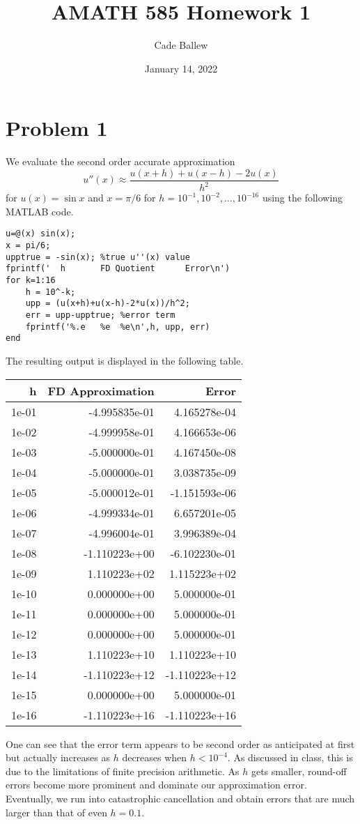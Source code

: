 \documentclass{article}
\title{AMATH 585 Homework 1}
\author{Cade Ballew}
\date{January 14, 2022}
\begin{document}
\maketitle

\section{Problem 1}
We evaluate the second order 
accurate approximation 
\[
u'' (x) \approx \frac{u(x+h) + u(x-h) - 2 u(x)}{h^2}
\]
for $u(x) = \sin x$ and $x = \pi / 6$ for $h = 10^{-1} , 10^{-2} , \ldots ,
10^{-16}$ using the following MATLAB code. 
\begin{verbatim}
u=@(x) sin(x);
x = pi/6;
upptrue = -sin(x); %true u''(x) value
fprintf('  h       FD Quotient      Error\n')
for k=1:16
    h = 10^-k;
    upp = (u(x+h)+u(x-h)-2*u(x))/h^2;
    err = upp-upptrue; %error term
    fprintf('%.e   %e  %e\n',h, upp, err)
end
\end{verbatim}
The resulting output is displayed in the following table. 

\begin{table}[H]\centering
\begin{tabular}{|r|r|r|} \hline
{h} & {FD Approximation} & {Error} \\ \hline
1e-01   &-4.995835e-01&  4.165278e-04\\
1e-02  & -4.999958e-01&  4.166653e-06\\
1e-03 &  -5.000000e-01&  4.167450e-08\\
1e-04&   -5.000000e-01&  3.038735e-09\\
1e-05   &-5.000012e-01 & -1.151593e-06\\
1e-06  & -4.999334e-01  &6.657201e-05\\
1e-07 &  -4.996004e-01  &3.996389e-04\\
1e-08&   -1.110223e+00&  -6.102230e-01\\
1e-09   &1.110223e+02 & 1.115223e+02\\
1e-10  & 0.000000e+00 & 5.000000e-01\\
1e-11 &  0.000000e+00 & 5.000000e-01\\
1e-12&   0.000000e+00 & 5.000000e-01\\
1e-13  & 1.110223e+10 & 1.110223e+10\\
1e-14 &  -1.110223e+12 & -1.110223e+12\\
1e-15&   0.000000e+00 & 5.000000e-01\\
1e-16&   -1.110223e+16 & -1.110223e+16\\ \hline
\end{tabular}
\end{table}
One can see that the error term appears to be second order as anticipated at first but actually increases as $h$ decreases when $h<10^{-4}$. As discussed in class, this is due to the limitations of finite precision arithmetic. As $h$ gets smaller, round-off errors become more prominent and dominate our approximation error. Eventually, we run into catastrophic cancellation and obtain errors that are much larger than that of even $h=0.1$. 
\end{document}
